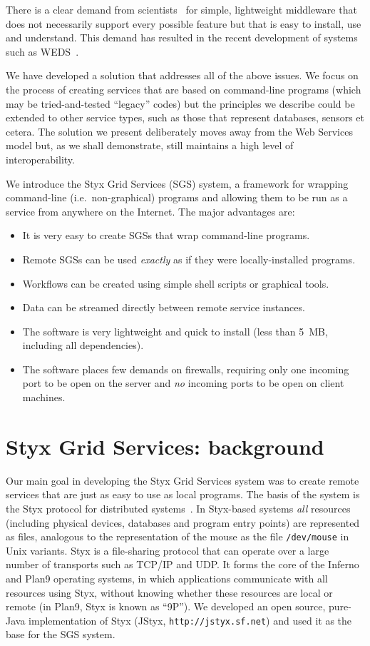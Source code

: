 \documentclass{article}
\begin{document}
There is a clear demand from scientists~\cite{chin:2004} for simple, lightweight middleware that does not necessarily support every possible feature but that is easy to install, use and understand.  This demand has resulted in the recent development of systems such as WEDS~\cite{weds}.

We have developed a solution that addresses all of the above issues.  We focus on the process of creating services that are based on command-line programs (which may be tried-and-tested ``legacy'' codes) but the principles we describe could be extended to other service types, such as those that represent databases, sensors et cetera.  The solution we present deliberately moves away from the Web Services model but, as we shall demonstrate, still maintains a high level of interoperability.

We introduce the Styx Grid Services (SGS) system, a framework for wrapping command-line (i.e.\ non-graphical) programs and allowing them to be run as a service from anywhere on the Internet.  The major advantages are:
\begin{itemize}
  \item It is very easy to create SGSs that wrap command-line programs.
	\item Remote SGSs can be used {\em exactly\/} as if they were locally-installed programs.
	\item Workflows can be created using simple shell scripts or graphical tools.
	\item Data can be streamed directly between remote service instances.
	\item The software is very lightweight and quick to install (less than 5~MB, including all dependencies).
	\item The software places few demands on firewalls, requiring only one incoming port to be open on the server and {\em no\/} incoming ports to be open on client machines.
\end{itemize}


\section{Styx Grid Services: background}\label{sec:sgsoverview}
Our main goal in developing the Styx Grid Services system was to create remote services that are just as easy to use as local programs.  The basis of the system is the Styx protocol for distributed systems~\cite{Pike:1999}.  In Styx-based systems {\em all\/} resources (including physical devices, databases and program entry points)
are represented as files, analogous to the representation of the mouse as the file {\tt /dev/mouse} in Unix variants.  Styx is a file-sharing protocol that can operate over a large number of transports such as TCP/IP and UDP.  It forms the core of the Inferno and Plan9 operating systems, %
in which applications communicate with all resources using Styx, without knowing whether these resources are local or remote  (in Plan9, Styx is known as ``9P'').  We developed an open source, pure-Java implementation of Styx (JStyx, {\tt http://jstyx.sf.net}) and used it as the base for the SGS system.
\end{document}
